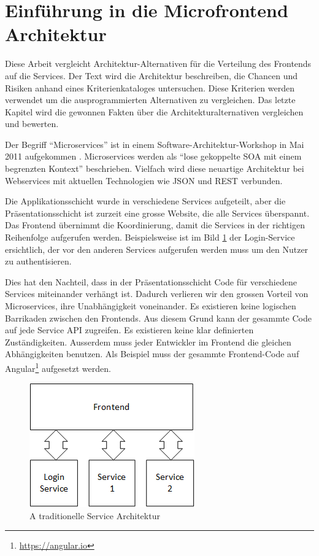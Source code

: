 
\section{Einführung in die Microfrontend Architektur}

Diese Arbeit vergleicht Architektur-Alternativen für die Verteilung des Frontends auf die Services. Der Text wird die Architektur beschreiben, die Chancen und Risiken anhand eines Kriterienkataloges untersuchen. Diese Kriterien werden verwendet um die ausprogrammierten Alternativen zu vergleichen. Das letzte Kapitel wird die gewonnen Fakten über die Architekturalternativen vergleichen und bewerten.

Der Begriff \enquote{Microservices}  ist in einem Software-Architektur-Workshop in Mai 2011 aufgekommen \cite{ieeeJournal2018}. Microservices werden als \enquote{lose gekoppelte \ac{SOA} mit einem begrenzten Kontext}\cite{cockcroft2016} beschrieben. Vielfach wird diese neuartige Architektur bei Webservices mit aktuellen Technologien wie \ac{JSON} und \ac{REST} verbunden. 

Die Applikationsschicht wurde in verschiedene Services aufgeteilt, aber die Präsentationsschicht ist zurzeit eine grosse Website, die alle Services überspannt. Das Frontend übernimmt die Koordinierung, damit die Services in der richtigen Reihenfolge aufgerufen werden. Beispielsweise ist im Bild \ref{fig:requirements:introduction:traditional} der Login-Service ersichtlich, der vor den anderen Services aufgerufen werden muss um den Nutzer zu authentisieren.

Dies hat den Nachteil, dass in der Präsentationsschicht Code für verschiedene Services miteinander verhängt ist. Dadurch verlieren wir den grossen Vorteil von Microservices, ihre Unabhängigkeit voneinander. Es existieren keine logischen Barrikaden zwischen den Frontends. Aus diesem Grund kann der gesammte Code auf jede Service API zugreifen. Es existieren keine klar definierten Zuständigkeiten. Ausserdem muss jeder Entwickler im Frontend die gleichen Abhängigkeiten benutzen. Als Beispiel muss der gesammte Frontend-Code auf Angular\footnote{\url{https://angular.io}} aufgesetzt werden.

\begin{figure}
    \centering
    \includegraphics{./sections/requirements/assets/TraditionalArchitecture}
    \caption{A traditionelle Service Architektur}
    \label{fig:requirements:introduction:traditional}
\end{figure}

